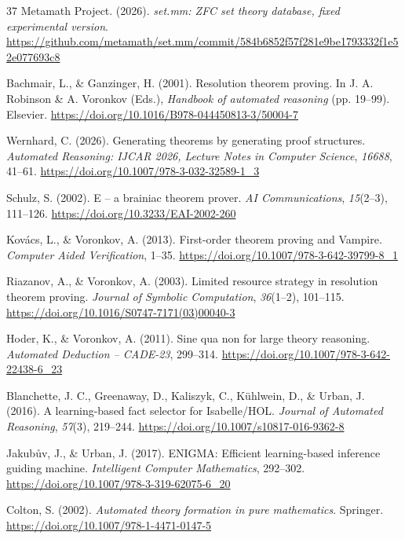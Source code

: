 \documentclass[pdflatex,sn-basic,Numbered]{sn-jnl}
\begin{document}
\setlength{\bibsep}{0.7em}
\begin{thebibliography}{37}
 Metamath Project. (2026). \emph{set.mm: ZFC set theory database, fixed experimental version}. \url{https://github.com/metamath/set.mm/commit/584b6852f57f281e9be1793332f1e52e077693c8}

 Bachmair, L., \& Ganzinger, H. (2001). Resolution theorem proving. In J. A. Robinson \& A. Voronkov (Eds.), \emph{Handbook of automated reasoning} (pp. 19--99). Elsevier. \url{https://doi.org/10.1016/B978-044450813-3/50004-7}

 Wernhard, C. (2026). Generating theorems by generating proof structures. \emph{Automated Reasoning: IJCAR 2026, Lecture Notes in Computer Science}, \emph{16688}, 41--61. \url{https://doi.org/10.1007/978-3-032-32589-1_3}

 Schulz, S. (2002). E -- a brainiac theorem prover. \emph{AI Communications}, \emph{15}(2--3), 111--126. \url{https://doi.org/10.3233/EAI-2002-260}

 Kov\'{a}cs, L., \& Voronkov, A. (2013). First-order theorem proving and Vampire. \emph{Computer Aided Verification}, 1--35. \url{https://doi.org/10.1007/978-3-642-39799-8_1}

 Riazanov, A., \& Voronkov, A. (2003). Limited resource strategy in resolution theorem proving. \emph{Journal of Symbolic Computation}, \emph{36}(1--2), 101--115. \url{https://doi.org/10.1016/S0747-7171(03)00040-3}

 Hoder, K., \& Voronkov, A. (2011). Sine qua non for large theory reasoning. \emph{Automated Deduction -- CADE-23}, 299--314. \url{https://doi.org/10.1007/978-3-642-22438-6_23}

 Blanchette, J. C., Greenaway, D., Kaliszyk, C., K\"{u}hlwein, D., \& Urban, J. (2016). A learning-based fact selector for Isabelle/HOL. \emph{Journal of Automated Reasoning}, \emph{57}(3), 219--244. \url{https://doi.org/10.1007/s10817-016-9362-8}

 Jakub\r{u}v, J., \& Urban, J. (2017). ENIGMA: Efficient learning-based inference guiding machine. \emph{Intelligent Computer Mathematics}, 292--302. \url{https://doi.org/10.1007/978-3-319-62075-6_20}

 Colton, S. (2002). \emph{Automated theory formation in pure mathematics}. Springer. \url{https://doi.org/10.1007/978-1-4471-0147-5}


\end{thebibliography}
\end{document}
